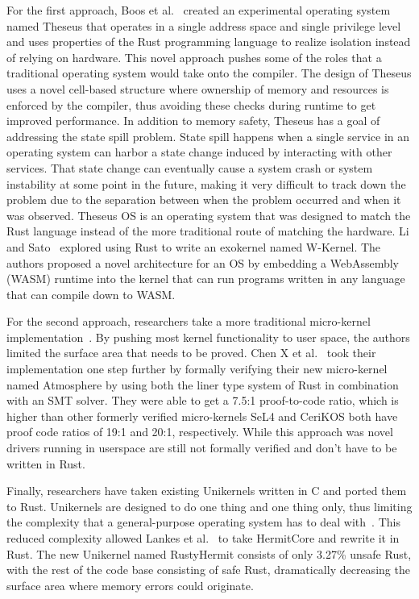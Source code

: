 \documentclass[sigconf]{acmart}
\begin{document}
For the first approach, Boos et al.~\cite{Boos2020-zh} created an experimental operating system
named Theseus that operates in a single address space and single privilege level and uses properties
of the Rust programming language to realize isolation instead of relying on hardware. This novel
approach pushes some of the roles that a traditional operating system would take onto the
compiler. The design of Theseus uses a novel cell-based structure where ownership of memory and
resources is enforced by the compiler, thus avoiding these checks during runtime to get improved
performance. In addition to memory safety, Theseus has a goal of addressing the state spill
problem. State spill happens when a single service in an operating system can harbor a state change
induced by interacting with other services. That state change can eventually cause a system crash or
system instability at some point in the future, making it very difficult to track down the problem
due to the separation between when the problem occurred and when it was observed. Theseus OS is an
operating system that was designed to match the Rust language instead of the more traditional route
of matching the hardware. Li and Sato~\cite{Li2024-yb} explored using Rust to write an exokernel named W-Kernel. The authors proposed a novel architecture for an OS by embedding a WebAssembly (WASM) runtime into the kernel that can run programs written in any language that can compile down to WASM.

For the second approach, researchers take a more traditional micro-kernel implementation~\cite{Chen2023-wb, Liang2021-bo}. By pushing most kernel functionality
to user space, the authors limited the surface area that needs to be proved. Chen X et al.~\cite{Chen2023-wb} took
their implementation one step further by formally verifying their new micro-kernel named Atmosphere
by using both the liner type system of Rust in combination with an SMT solver. They were
able to get a 7.5:1 proof-to-code ratio, which is higher than other formerly verified micro-kernels
SeL4 and CeriKOS both have proof code ratios of 19:1 and 20:1, respectively. While this
approach was novel drivers running in userspace are still not formally verified and don't have to be
written in Rust.

Finally, researchers have taken existing Unikernels written in C and ported them to Rust. Unikernels are designed to do one thing
and one thing only, thus limiting the complexity that a general-purpose operating system has to
deal with~\cite{Madhavapeddy2014-zw}. This reduced complexity allowed  Lankes et al.~\cite{Lankes2019-cm} to take HermitCore and rewrite it in Rust. The new
Unikernel named RustyHermit consists of only 3.27\% unsafe Rust, with the rest of the code base consisting of safe Rust, dramatically decreasing the surface area where memory errors could originate.
\end{document}
